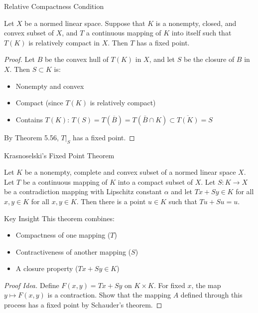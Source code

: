 \documentclass[aspectratio=169,10pt]{beamer}
\begin{document}
\begin{frame}[allowframebreaks]{Relative Compactness Condition}
    \begin{theorem}[Theorem 5.59]
        Let $X$ be a normed linear space. Suppose that $K$ is a nonempty, closed, and convex subset of $X$, and $T$ a continuous mapping of $K$ into itself such that $T(K)$ is relatively compact in $X$. Then $T$ has a fixed point.
    \end{theorem}

    \begin{proof}
        Let $B$ be the convex hull of $T(K)$ in $X$, and let $S$ be the closure of $B$ in $X$. Then $S \subset K$ is:
        \begin{itemize}
            \item Nonempty and convex
            \item Compact (since $T(K)$ is relatively compact)
            \item Contains $T(K)$: $T(S) = T(\overline{B}) = T(\bar{B} \cap K) \subset \overline{T(K)} = S$
        \end{itemize}
        By Theorem 5.56, $T|_S$ has a fixed point.
    \end{proof}
\end{frame}

\begin{frame}[allowframebreaks]{Krasnoselski's Fixed Point Theorem}
    \begin{theorem}
        Let $K$ be a nonempty, complete and convex subset of a normed linear space $X$. Let $T$ be a continuous mapping of $K$ into a compact subset of $X$. Let $S: K \to X$ be a contradiction mapping with Lipschitz constant $\alpha$ and let $Tx + Sy \in K$ for all $x, y \in K$ for all $x, y \in K$. Then there is a point $u \in K$ such that $Tu + Su = u$.
    \end{theorem}

    \begin{block}{Key Insight}
        This theorem combines:
        \begin{itemize}
            \item Compactness of one mapping ($T$)
            \item Contractiveness of another mapping ($S$)
            \item A closure property ($Tx + Sy \in K$)
        \end{itemize}
    \end{block}

    \begin{proof}[Proof Idea]
        Define $F(x,y) = Tx + Sy$ on $K \times K$. For fixed $x$, the map $y \mapsto F(x,y)$ is a contraction. Show that the mapping $A$ defined through this process has a fixed point by Schauder's theorem.
    \end{proof}
\end{frame}
\end{document}
